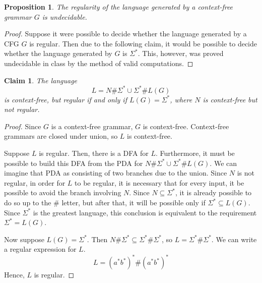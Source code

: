 \documentclass[letterpaper,11pt]{article}
\newtheorem{proposition}{Proposition}
\newtheorem{claim}{Claim}
\begin{document}
\begin{enumerate}
\begin{enumerate}
                \begin{proposition}
                    The regularity of the language generated by a context-free
                    grammar $G$ is undecidable.
                \end{proposition}

                \begin{proof}
                    Suppose it were possible to decide whether the language
                    generated by a CFG $G$ is regular. Then due to the
                    following claim, it would be possible to decide whether the
                    language generated by $G$ is $\Sigma^*$. This, however, was
                    proved undecidable in class by the method of valid
                    computations.
                \end{proof}

                \begin{claim}
                    The language
                    $$L = N\#\Sigma^* \cup \Sigma^*\# L(G)$$
                    is context-free, but regular if and only if
                    $L(G) = \Sigma^*$, where $N$ is context-free but not
                    regular.
                \end{claim}

                \begin{proof}
                    Since $G$ is a context-free grammar, $G$ is context-free.
                    Context-free grammars are closed under union, so $L$ is
                    context-free.

                    Suppose $L$ is regular. Then, there is a DFA for $L$.
                    Furthermore, it must be possible to build this DFA from
                    the PDA for $N\#\Sigma^* \cup \Sigma^*\# L(G)$. We can
                    imagine that PDA as consisting of two branches due to
                    the union. Since $N$ is not regular, in order for $L$
                    to be regular, it is necessary that for every input, it
                    be possible to avoid the branch involving $N$. Since
                    $N \subseteq \Sigma^*$, it is already possible to do so
                    up to the $\#$ letter, but after that, it will be
                    possible only if $\Sigma^* \subseteq L(G)$. Since
                    $\Sigma^*$ is the greatest language, this conclusion is
                    equivalent to the requirement $\Sigma^* = L(G)$.

                    Now suppose $L(G) = \Sigma^*$. Then $N\#\Sigma^*
                    \subseteq \Sigma^*\#\Sigma^*$, so
                    $L = \Sigma^*\#\Sigma^*$.
                    We can write a regular expression for $L$.
                    $$L = (a^* b^*)^* \# (a^* b^*)^*$$
                    Hence, $L$ is regular.
                \end{proof}
        \end{enumerate}
\end{enumerate}
\end{document}
